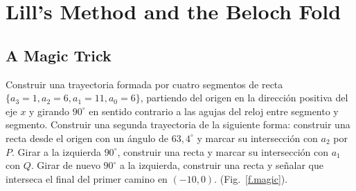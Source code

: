 
\chapter{Lill's Method and the Beloch Fold}\label{c.origami-cube}


\section{A Magic Trick}\label{s.magic}

Construir una trayectoria formada por cuatro segmentos de recta $\{a_3=1,a_2=6,a_1=11,a_0=6\}$, partiendo del origen en la dirección positiva del eje $x$ y girando $90^\circ$ en sentido contrario a las agujas del reloj entre segmento y segmento. Construir una segunda trayectoria de la siguiente forma: construir una recta desde el origen con un ángulo de $63,4^\circ$ y marcar su intersección con $a_2$ por $P$. Girar a la izquierda $90^\circ$, construir una recta y marcar su intersección con $a_1$ con $Q$. Girar de nuevo $90^\circ$ a la izquierda, construir una recta y señalar que interseca el final del primer camino en $(-10,0)$.   (Fig.~\ref{f.magic}).

